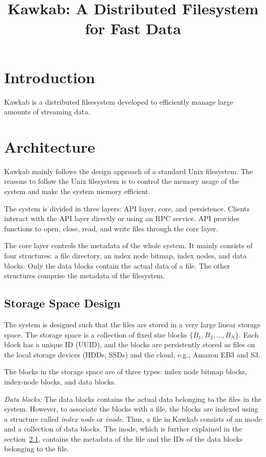 \documentclass[]{article}
\newcommand{\subtopic}[1]{\vspace{1.5pt} \noindent \textit{#1}}
\begin{document}
\title{Kawkab: A Distributed Filesystem for Fast Data}
\maketitle

\section{Introduction} Kawkab is a distributed filsesystem developed to
efficiently manage large amounts of streaming data.

\section{Architecture} Kawkab mainly follows the design approach of a standard
Unix filesystem. The reasons to follow the Unix filesystem is to control the
memory usage of the system and make the system memory efficient.

The system is divided in three layers: API layer, core, and persistence.
Clients interact with the API layer directly or using an RPC service.  API
provides functions to open, close, read, and write files through the core
layer.

The core layer controls the metadata of the whole system. It mainly consists of
four structures: a file directory, an index node bitmap, index nodes, and data
blocks. Only the data blocks contain the actual data of a file. The other
structures comprise the metadata of the filesystem.

\subsection{Storage Space Design}

The system is designed such that the files are stored in a very large linear
storage space. The storage space is a collection of fixed size blocks $\{B_1,
B_2, \ldots, B_N\}$.  Each block has a unique ID (UUID), and the blocks are
persistently stored as files on the local storage devices (HDDs, SSDs) and the
cloud, e.g., Amazon EB3 and S3.

The blocks in the storage space are of three types: index node bitmap blocks,
index-node blocks, and data blocks.

\subtopic{Data blocks:} The data blocks contains the actual data belonging to
the files in the system. However, to associate the blocks with a file, the
blocks are indexed using a structure called \textit{index node} or
\textit{inode}. Thus, a file in Kawkab consists of an inode and a collection of
data blocks. The inode, which is further explained in the section~\ref{},
contains the metadata of the file and the IDs of the data blocks belonging
to the file. 
\end{document}
